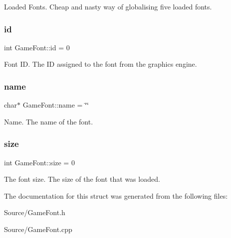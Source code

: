 Loaded Fonts. Cheap and nasty way of globalising five loaded fonts. \mbox{\label{struct_game_font_ae1e90d4b018bfa8edf42706e245d65f1}} 
\subsubsection{\texorpdfstring{id}{id}}
{\footnotesize\ttfamily int Game\+Font\+::id = 0}

Font ID. The ID assigned to the font from the graphics engine. \mbox{\label{struct_game_font_a144b59d96bf37c8876b2cd1f7db64d12}} 
\subsubsection{\texorpdfstring{name}{name}}
{\footnotesize\ttfamily char$\ast$ Game\+Font\+::name = \char`\"{}\char`\"{}}

Name. The name of the font. \mbox{\label{struct_game_font_ae81748d3a1c3b0b53650449e0fd4aeb5}} 
\subsubsection{\texorpdfstring{size}{size}}
{\footnotesize\ttfamily int Game\+Font\+::size = 0}

The font size. The size of the font that was loaded. 

The documentation for this struct was generated from the following files\+:\begin{DoxyCompactItemize}
\item 
Source/Game\+Font.\+h\item 
Source/Game\+Font.\+cpp\end{DoxyCompactItemize}
